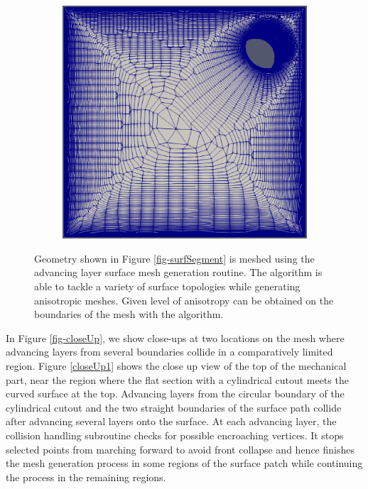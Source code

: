 \begin{figure}[hbt!]
\begin{subfigure}{0.33\textwidth}
		\includegraphics[width=0.9\linewidth]{img/r/joint-x0.004-g1.04-a5/bottom.eps}
		\caption{}
		\label{fig-joint-bottom}
	\end{subfigure}
	\caption[EDAMSurf mesh of a mechanical part (robustness test case 2).]{Geometry shown in Figure \ref{fig-surfSegment} is meshed using the advancing layer surface mesh generation routine. The algorithm is able to tackle a variety of surface topologies while generating anisotropic meshes. Given level of anisotropy can be obtained on the boundaries of the mesh with the algorithm.}
	\label{fig-joint}
\end{figure}

In Figure \ref{fig-closeUp}, we show close-ups at two locations on the mesh where advancing layers from several boundaries collide in a comparatively limited region. Figure \ref{closeUp1} shows the close up view of the top of the mechanical part, near the region where the flat section with a cylindrical cutout meets the curved surface at the top. Advancing layers from the circular boundary of the cylindrical cutout and the two straight boundaries of the surface path collide after advancing several layers onto the surface. At each advancing layer, the collision handling subroutine checks for possible encroaching vertices. It stops selected points from marching forward to avoid front collapse and hence finishes the mesh generation process in some regions of the surface patch while continuing the process in the remaining regions.

